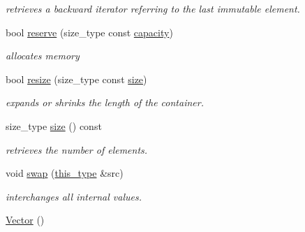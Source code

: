 \begin{DoxyCompactItemize}
\begin{DoxyCompactList}\small\item\em retrieves a backward iterator referring to the last immutable element. \end{DoxyCompactList}\item 
bool \hyperlink{classhryky_1_1_vector_a4d2a2874dcc88826b45782d4b1b73051}{reserve} (size\-\_\-type const \hyperlink{classhryky_1_1_vector_a0865b1eec33d6dfe008eb7c24afd5f97}{capacity})
\begin{DoxyCompactList}\small\item\em allocates memory \end{DoxyCompactList}\item 
\hypertarget{classhryky_1_1_vector_a9148eb8972b43ed3a7e807d19be848a5}{bool \hyperlink{classhryky_1_1_vector_a9148eb8972b43ed3a7e807d19be848a5}{resize} (size\-\_\-type const \hyperlink{classhryky_1_1_vector_a4bf9016a68dd7bf4967bf202b884a4fa}{size})}\label{classhryky_1_1_vector_a9148eb8972b43ed3a7e807d19be848a5}

\begin{DoxyCompactList}\small\item\em expands or shrinks the length of the container. \end{DoxyCompactList}\item 
\hypertarget{classhryky_1_1_vector_a4bf9016a68dd7bf4967bf202b884a4fa}{size\-\_\-type \hyperlink{classhryky_1_1_vector_a4bf9016a68dd7bf4967bf202b884a4fa}{size} () const }\label{classhryky_1_1_vector_a4bf9016a68dd7bf4967bf202b884a4fa}

\begin{DoxyCompactList}\small\item\em retrieves the number of elements. \end{DoxyCompactList}\item 
\hypertarget{classhryky_1_1_vector_abcf365626457abf95d05b0a736e7a60a}{void \hyperlink{classhryky_1_1_vector_abcf365626457abf95d05b0a736e7a60a}{swap} (\hyperlink{classhryky_1_1_vector}{this\-\_\-type} \&src)}\label{classhryky_1_1_vector_abcf365626457abf95d05b0a736e7a60a}

\begin{DoxyCompactList}\small\item\em interchanges all internal values. \end{DoxyCompactList}\item 
\hypertarget{classhryky_1_1_vector_abe97d2779dcc79a8d599dbd8ff66451b}{\hyperlink{classhryky_1_1_vector_abe97d2779dcc79a8d599dbd8ff66451b}{Vector} ()}\label{classhryky_1_1_vector_abe97d2779dcc79a8d599dbd8ff66451b}


\end{DoxyCompactItemize}
